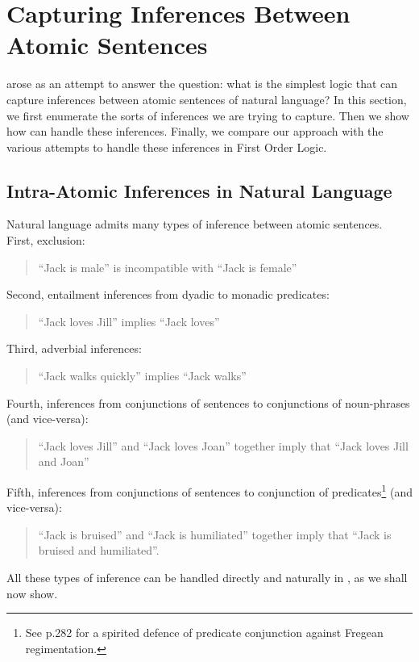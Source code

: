 
\section{Capturing Inferences Between Atomic Sentences}
\ELFULL{} arose as an attempt to answer the question: what is the simplest logic that can capture inferences between atomic sentences of natural language? 
In this section, we first enumerate the sorts of inferences we are trying to capture.
Then we show how \ELABR{} can handle these inferences.
Finally, we compare our approach with the various attempts to handle these inferences in First Order Logic.

\subsection{Intra-Atomic Inferences in Natural Language}
Natural language admits many types of inference between atomic sentences.
First, exclusion:
\begin{quote}
``Jack is male'' is incompatible with ``Jack is female''
\end{quote}
Second, entailment inferences from dyadic to monadic predicates:
\begin{quote}
``Jack loves Jill'' implies ``Jack loves''
\end{quote}
Third, adverbial inferences:
\begin{quote}
``Jack walks quickly'' implies ``Jack walks''
\end{quote}
Fourth, inferences from conjunctions of sentences to conjunctions of noun-phrases (and vice-versa):
\begin{quote}
``Jack loves Jill'' and ``Jack loves Joan'' together imply that ``Jack loves Jill and Joan''
\end{quote}
Fifth, inferences from conjunctions of sentences to conjunction of predicates\footnote{See \cite{sommers} p.282 for a spirited defence of predicate conjunction against Fregean regimentation.} (and vice-versa):
\begin{quote}
``Jack is bruised'' and ``Jack is humiliated'' together imply that ``Jack is bruised and humiliated''.
\end{quote}

All these types of inference can be handled directly and naturally in \ELABR{}, as we shall now show.


